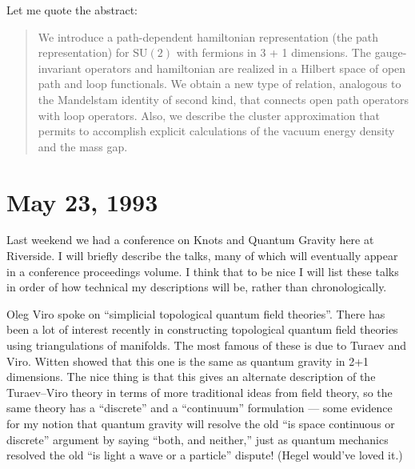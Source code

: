 \documentclass[12pt]{article}
\begin{document}
Let me quote the abstract:

\begin{quote}
We introduce a path-dependent hamiltonian representation (the path
representation) for \(\mathrm{SU}(2)\) with fermions in 3 + 1
dimensions. The gauge-invariant operators and hamiltonian are realized
in a Hilbert space of open path and loop functionals. We obtain a new
type of relation, analogous to the Mandelstam identity of second kind,
that connects open path operators with loop operators. Also, we describe
the cluster approximation that permits to accomplish explicit
calculations of the vacuum energy density and the mass gap.
\end{quote}



\hypertarget{week15}{%
\section{May 23, 1993}\label{week15}}

Last weekend we had a conference on Knots and Quantum Gravity here at
Riverside. I will briefly describe the talks, many of which will
eventually appear in a conference proceedings volume. I think that to be
nice I will list these talks in order of how technical my descriptions
will be, rather than chronologically.

Oleg Viro spoke on ``simplicial topological quantum field theories''.
There has been a lot of interest recently in constructing topological
quantum field theories using triangulations of manifolds. The most
famous of these is due to Turaev and Viro. Witten showed that this one
is the same as quantum gravity in 2+1 dimensions. The nice thing is that
this gives an alternate description of the Turaev--Viro theory in terms
of more traditional ideas from field theory, so the same theory has a
``discrete'' and a ``continuum'' formulation --- some evidence for my
notion that quantum gravity will resolve the old ``is space continuous
or discrete'' argument by saying ``both, and neither,'' just as quantum
mechanics resolved the old ``is light a wave or a particle'' dispute!
(Hegel would've loved it.)
\end{document}
